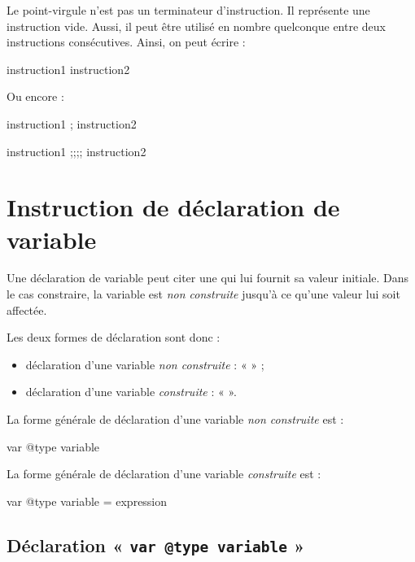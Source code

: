 Le point-virgule n'est pas un terminateur d'instruction. Il représente une instruction vide. Aussi, il peut être utilisé en nombre quelconque entre deux instructions consécutives. Ainsi, on peut écrire :

\begin{galgascode}
instruction1  instruction2
\end{galgascode}

Ou encore :
\begin{galgascode}
instruction1 ; instruction2
\end{galgascode}
\begin{galgascode}
instruction1 ;;;; instruction2
\end{galgascode}







\section{Instruction de déclaration de variable}


Une déclaration de variable peut citer une  qui lui fournit sa valeur initiale. Dans le cas constraire, la variable est \emph{non construite} jusqu'à ce qu'une valeur lui soit affectée.

Les deux formes de déclaration sont donc :
\begin{itemize}
\item déclaration d'une variable \emph{non construite} : «  » ;
\item déclaration d'une variable \emph{construite} : «  ».
\end{itemize}



La forme générale de déclaration d'une variable \emph{non construite} est :
\begin{galgascode}
var @type variable
\end{galgascode}


La forme générale de déclaration d'une variable \emph{construite} est :
\begin{galgascode}
var @type variable = expression
\end{galgascode}

\subsection{Déclaration « \texttt{var @type variable} »}

